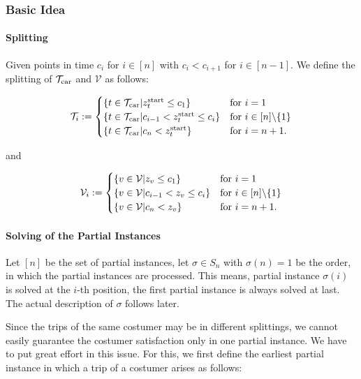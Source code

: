\subsubsection{Basic Idea}
\label{subsubsec:basic_idea}

\paragraph{Splitting} \parfill

Given points in time $c_i$ for $i\in[n]$ with $c_i<c_{i+1}$ for $i\in[n-1]$. We define the splitting of $\mathcal{T}_{\operatorname{car}}$ and $\mathcal{V}$ as follows:

\begin{align*}
	\mathcal{T}_i := \begin{cases}
		\left\{t\in\mathcal{T}_{\operatorname{car}}|z^{\operatorname{start}}_t\leq c_1\right\} & \text{for } i=1 \\
		\left\{t\in\mathcal{T}_{\operatorname{car}}|c_{i-1}<z^{\operatorname{start}}_t\leq c_i\right\} & \text{for } i\in[n]\backslash\{1\} \\
		\left\{t\in\mathcal{T}_{\operatorname{car}}|c_n<z^{\operatorname{start}}_t\right\} & \text{for } i=n+1.
	\end{cases}
\end{align*}

and

\begin{align*}
	\mathcal{V}_i := \begin{cases}
		\left\{v\in\mathcal{V}|z_v\leq c_1\right\} & \text{for } i=1 \\
		\left\{v\in\mathcal{V}|c_{i-1}<z_v\leq c_i\right\} & \text{for } i\in[n]\backslash\{1\} \\
		\left\{v\in\mathcal{V}|c_n<z_v\right\} & \text{for } i=n+1.
	\end{cases}
\end{align*}

\paragraph{Solving of the Partial Instances} \parfill

Let $[n]$ be the set of partial instances, let $\sigma\in S_n$ with $\sigma(n)=1$ be the order, in which the partial instances are processed. This means, partial instance $\sigma(i)$ is solved at the $i$-th position, the first partial instance is always solved at last. The actual description of $\sigma$ follows later.

Since the trips of the same costumer may be in different splittings, we cannot easily guarantee the costumer satisfaction only in one partial instance. We have to put great effort in this issue. For this, we first define the earliest partial instance in which a trip of a costumer arises as follows:

